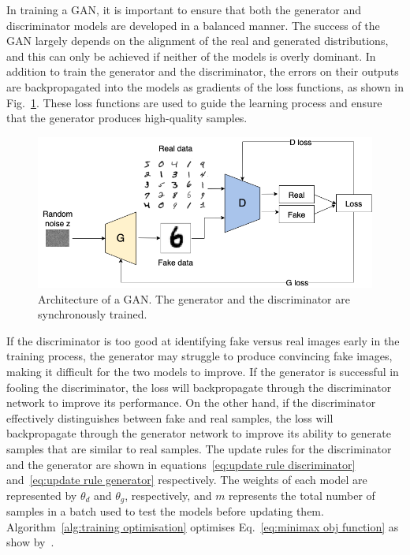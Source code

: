 \noindent In training a GAN, it is important to ensure that both the generator and discriminator models are developed in a balanced manner. The success of the GAN largely depends on the alignment of the real and generated distributions, and this can only be achieved if neither of the models is overly dominant.
In addition to train the generator and the discriminator, the errors on their outputs are backpropagated into the models as gradients of the loss functions, as shown in Fig.~\ref{fig:GAN architecture w loss}. These loss functions are used to guide the learning process and ensure that the generator produces high-quality samples.
\begin{figure}[!ht]
\centering
  \includegraphics[scale=0.4]{figures/gan-architecture.png}
  \caption{Architecture of a GAN. The generator and the discriminator are synchronously trained.}
  \label{fig:GAN architecture w loss}
\end{figure}
If the discriminator is too good at identifying fake versus real images early in the training process, the generator may struggle to produce convincing fake images, making it difficult for the two models to improve. If the generator is successful in fooling the discriminator, the loss will backpropagate through the discriminator network to improve its performance. On the other hand, if the discriminator effectively distinguishes between fake and real samples, the loss will backpropagate through the generator network to improve its ability to generate samples that are similar to real samples.
The update rules for the discriminator and the generator are shown in equations~\ref{eq:update rule discriminator} and~\ref{eq:update rule generator} respectively. The weights of each model are represented by $\theta_d$ and $\theta_g$, respectively, and $m$ represents the total number of samples in a batch used to test the models before updating them. Algorithm~\ref{alg:training optimisation} optimises Eq.~\ref{eq:minimax obj function} as show by~\cite{GANGoodfellow}.

